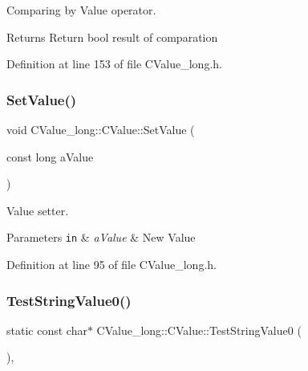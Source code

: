 Comparing by Value operator. 

\begin{DoxyReturn}{Returns}
Return {\ttfamily bool} result of comparation 
\end{DoxyReturn}


Definition at line 153 of file C\+Value\+\_\+long.\+h.

\mbox{\label{class_c_value__long_1_1_c_value_a8caf06185aa1c4ecd60d70c5d0d02631}} 
\subsubsection{\texorpdfstring{Set\+Value()}{SetValue()}}
{\footnotesize\ttfamily void C\+Value\+\_\+long\+::\+C\+Value\+::\+Set\+Value (\begin{DoxyParamCaption}\item[{const long}]{a\+Value }\end{DoxyParamCaption})\hspace{0.3cm}{\ttfamily [inline]}}



Value setter. 


\begin{DoxyParams}[1]{Parameters}
\mbox{\tt in}  & {\em a\+Value} & New Value \\
\hline
\end{DoxyParams}


Definition at line 95 of file C\+Value\+\_\+long.\+h.

\mbox{\label{class_c_value__long_1_1_c_value_a968b499ab9cb7a19475ea45c51ed9a6e}} 
\subsubsection{\texorpdfstring{Test\+String\+Value0()}{TestStringValue0()}}
{\footnotesize\ttfamily static const char$\ast$ C\+Value\+\_\+long\+::\+C\+Value\+::\+Test\+String\+Value0 (\begin{DoxyParamCaption}{ }\end{DoxyParamCaption})\hspace{0.3cm}{\ttfamily [inline]}, {\ttfamily [static]}}



